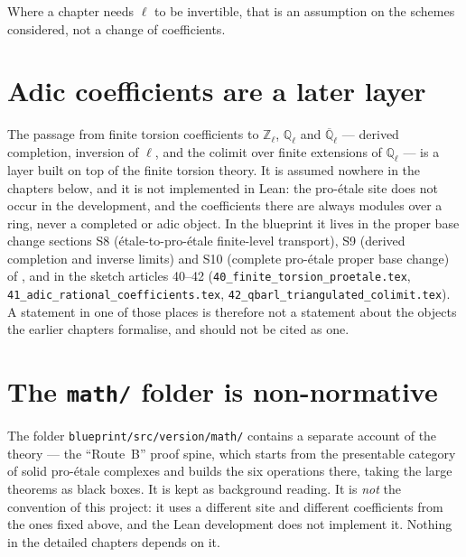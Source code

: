Where a chapter needs $\ell$ to be invertible, that is an assumption on the
schemes considered, not a change of coefficients.

\section{Adic coefficients are a later layer}

The passage from finite torsion coefficients to $\mathbb Z_\ell$, $\mathbb
Q_\ell$ and $\overline{\mathbb Q}_\ell$ --- derived completion, inversion of
$\ell$, and the colimit over finite extensions of $\mathbb Q_\ell$ --- is a
layer built on top of the finite torsion theory.  It is assumed nowhere in the
chapters below, and it is not implemented in Lean: the pro-\'etale site does
not occur in the development, and the coefficients there are always modules
over a ring, never a completed or adic object.  In the blueprint it lives
in the proper base change sections S8 (\'etale-to-pro-\'etale finite-level
transport), S9 (derived completion and inverse limits) and S10 (complete
pro-\'etale proper base change) of , and in the
sketch articles 40--42 (\texttt{40\_finite\_torsion\_proetale.tex},
\texttt{41\_adic\_rational\_coefficients.tex},
\texttt{42\_qbarl\_triangulated\_colimit.tex}).  A statement in one of those
places is therefore not a statement about the objects the earlier chapters
formalise, and should not be cited as one.

\section{The \texttt{math/} folder is non-normative}

The folder \texttt{blueprint/src/version/math/} contains a separate account of
the theory --- the ``Route~B'' proof spine, which starts from the presentable
category of solid pro-\'etale complexes and builds the six operations there,
taking the large theorems as black boxes.  It is kept as background reading.
It is \emph{not} the convention of this project: it uses a different site and
different coefficients from the ones fixed above, and the Lean development does
not implement it.  Nothing in the detailed chapters depends on it.
